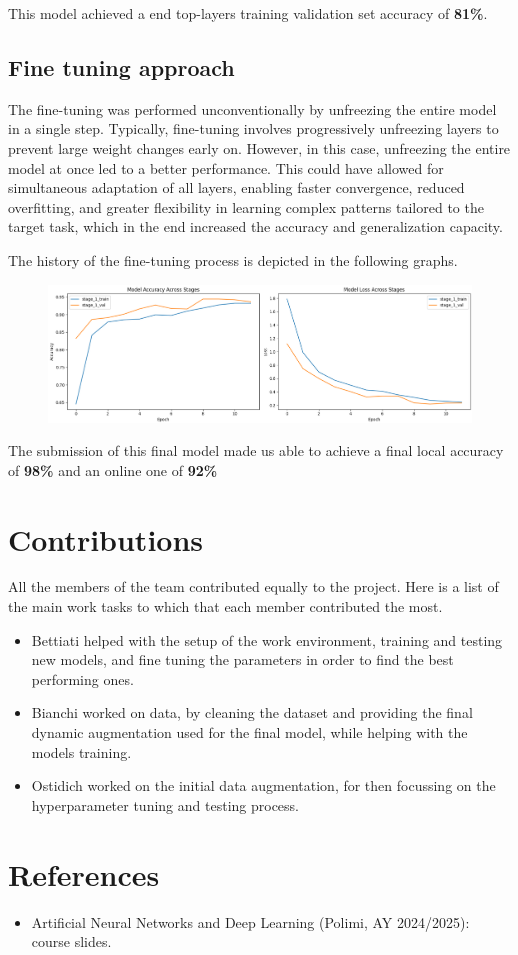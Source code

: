 \documentclass[11pt]{article}
\begin{document}
This model achieved a end top-layers training validation set accuracy of \textbf{81\%}.

\subsection{Fine tuning approach}

The fine-tuning was performed unconventionally by unfreezing the entire model in a single step.
Typically, fine-tuning involves progressively unfreezing layers to prevent large weight changes early on.
However, in this case, unfreezing the entire model at once led to a better performance. 
This could have allowed for simultaneous adaptation of all layers, enabling faster convergence, reduced overfitting, and greater flexibility in learning complex patterns tailored to the target task, which in the end increased the accuracy and generalization capacity.

The history of the fine-tuning process is depicted in the following graphs.

\begin{figure}[h!]
    \centering
    \includegraphics[width=\textwidth]{images/final_model_history.png}
\end{figure}

The submission of this final model made us able to achieve a final local accuracy of \textbf{98\%} and an online one of \textbf{92\%}

\section{Contributions}

All the members of the team contributed equally to the project. 
Here is a list of the main work tasks to which that each member contributed the most.

\begin{itemize}
    \item Bettiati helped with the setup of the work environment, training and testing new models, and fine tuning the parameters in order to find the best performing ones.
    \item Bianchi worked on data, by cleaning the dataset and providing the final dynamic augmentation used for the final model, while helping with the models training.
    \item Ostidich worked on the initial data augmentation, for then focussing on the hyperparameter tuning and testing process.
\end{itemize}

\section{References}

\begin{itemize}
    \item Artificial Neural Networks and Deep Learning (Polimi, AY 2024/2025): course slides.
\end{itemize}
\end{document}

